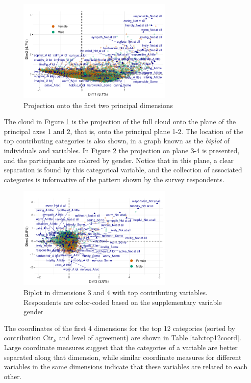 \documentclass[conference,final,]{IEEEtran}
\begin{document}
\begin{figure}[h!] 
\centering 
\includegraphics[width=3in]{../figs/newbiplot12.pdf}
\caption{Projection onto the first two principal dimensions}
\label{fig:biplot} 
\end{figure}

The cloud in Figure \ref{fig:biplot} is the projection of the full cloud
onto the plane of the principal axes 1 and 2, that is, onto the
principal plane 1-2. The location of the top contributing categories is
also shown, in a graph known as the \emph{biplot} of individuals and
variables. In Figure \ref{fig:plane34} the projection on plane 3-4 is
presented, and the participants are colored by gender. Notice that in
this plane, a clear separation is found by this categorical variable,
and the collection of associated categories is informative of the
pattern shown by the survey respondents.

\begin{figure}[!ht] 
\centering 
\includegraphics[width=3in]{../figs/newbiplot34.pdf}
\caption{Biplot in dimensions 3 and 4 with top contributing variables. Respondents are color-coded based on the supplementary variable gender}
\label{fig:plane34} 
\end{figure}

The coordinates of the first 4 dimensions for the top 12 categories
(sorted by contribution \(\text{Ctr}_k\) and level of agreement) are
shown in Table \ref{tab:top12coord}. Large coordinate measures suggest
that the categories of a variable are better separated along that
dimension, while similar coordinate measures for different variables in
the same dimensions indicate that these variables are related to each
other.
\end{document}
